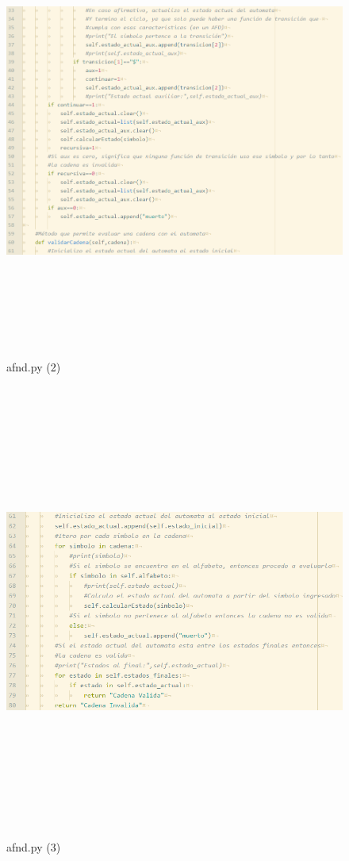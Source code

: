 	\begin{figure}[H]
		\begin{center}
			\includegraphics[width=15cm, height=15cm]{img/afnd_2.png}
			\caption{afnd.py (2)}
			\label{fig:tablas5}
		\end{center}
	\end{figure}
	\begin{figure}[H]
		\begin{center}
			\includegraphics[width=15cm, height=15cm]{img/afnd_3.png}
			\caption{afnd.py (3)}
			\label{fig:tablas6}
		\end{center}
	\end{figure}
	\newpage
